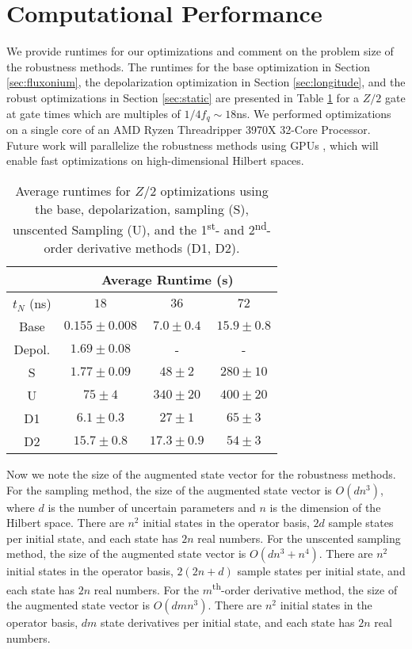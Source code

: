 \section{Computational Performance \label{appendix:time}}
We provide runtimes for our optimizations and comment on the problem size of the
robustness methods. The runtimes for
the base optimization in Section \ref{sec:fluxonium},
the depolarization optimization in Section \ref{sec:longitude},
and the robust optimizations in Section \ref{sec:static}
are presented in Table \ref{tab:time}
for a $Z/2$ gate at gate times which are multiples of $1/4f_{q} \sim 18$ns.
We performed optimizations on a single core of
an AMD Ryzen Threadripper 3970X 32-Core Processor.
Future work will parallelize the robustness methods using GPUs
\cite{leung2017speedup},
which will enable fast optimizations on high-dimensional Hilbert spaces.

\begin{table}[H]
  \centering
  \begin{tabular} {c | c | c | c }
    & \multicolumn{3}{c}{Average Runtime (s)}\\
    \hline
    $t_{N}$ (ns) & $18$ & $36$ & $72$\\
    \hline
    Base & $0.155 \pm 0.008$ & $7.0 \pm 0.4$ & $15.9 \pm 0.8$\\
    Depol. & $1.69 \pm 0.08$ & - & -\\
    S & $1.77 \pm 0.09$ & $48 \pm 2$ & $280 \pm 10$\\
    U & $75 \pm 4$ & $340 \pm 20$ & $400 \pm 20$\\
    D1 & $6.1 \pm 0.3$ & $27 \pm 1$ & $65 \pm 3$\\
    D2 & $15.7 \pm 0.8$ & $17.3 \pm 0.9$ & $54 \pm 3$\\
  \end{tabular}
  \caption{
    Average runtimes for $Z/2$ optimizations
    using the base, depolarization, sampling (S),
    unscented Sampling (U), and the 1\textsuperscript{st}-
    and 2\textsuperscript{nd}-order derivative methods (D1, D2).
  }
  \label{tab:time}
\end{table}

Now we note the size of the augmented state vector for the robustness methods.
For the sampling method, the size of the augmented state vector
is $O(dn^{3})$, where $d$ is the number of uncertain parameters and
$n$ is the dimension of the Hilbert space. There are $n^{2}$ initial states
in the operator basis, $2d$ sample states per initial state,
and each state has $2n$ real numbers.
For the unscented sampling method, the size of the augmented state vector
is $O(dn^{3} + n^{4})$.
There are $n^{2}$ initial states in the operator basis,
$2(2n + d)$ sample states per initial state,
and each state has $2n$ real numbers.
For the $m$\textsuperscript{th}-order derivative method, the size of the augmented state vector
is $O(dmn^{3})$. There are $n^{2}$
initial states in the operator basis, $dm$ state derivatives per initial state,
and each state has $2n$ real numbers. 
